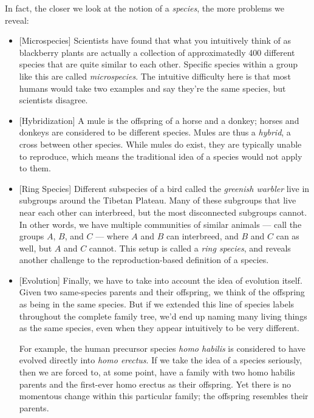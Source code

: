 \documentclass[11pt, oneside]{article}   	%
\begin{document}
In fact, the closer we look at the notion of a {\em species}, the more problems
we reveal:
\begin{itemize}
    \item{} [Microspecies] Scientists have found that what you intuitively
        think of as blackberry plants are actually a
        collection of approximatedly 400
        different species that are quite similar to each other. Specific
        species within a group like this are called {\em microspecies}.
        The intuitive difficulty here is that most humans would take two
        examples and say they're the same species, but scientists disagree.
    \item{} [Hybridization] A mule is the offspring of a horse and a donkey;
        horses and donkeys are considered to be different species.
        Mules are thus a {\em hybrid}, a cross between other species.
        While mules do
        exist, they are typically unable to reproduce, which means the
        traditional idea of a species would not apply to them.
    \item{} [Ring Species] Different subspecies of a bird called the
        {\em greenish warbler} live in subgroups around the Tibetan Plateau.
        Many of these subgroups that live near each other can interbreed, but
        the most disconnected subgroups cannot. In other words, we have multiple
        communities of similar animals --- call the groups $A$, $B$, and $C$ ---
        where $A$ and $B$ can interbreed, and $B$ and $C$ can as well, but $A$
        and $C$ cannot. This setup is called a {\em ring species}, and reveals
        another challenge to the reproduction-based definition of a species.
    \item{} [Evolution] Finally, we have to take into account the idea of
        evolution itself.
        Given two same-species parents and their offspring, we think of the
        offspring as being in the same species.
        But if we extended this line of
        species labels throughout the complete family tree, we'd end up naming
        many living things as the same species, even when they appear
        intuitively to be very different.

        For example, the human precursor species {\em homo habilis} is
        considered to have evolved directly into {\em homo erectus}.
        If we take the idea of a species seriously,
        then we are forced to, at some point, have a family
        with two homo habilis parents and
        the first-ever homo erectus as their offspring.
        Yet there is no momentous
        change within this particular family; the offspring resembles their
        parents.
\end{itemize}
\end{document}
